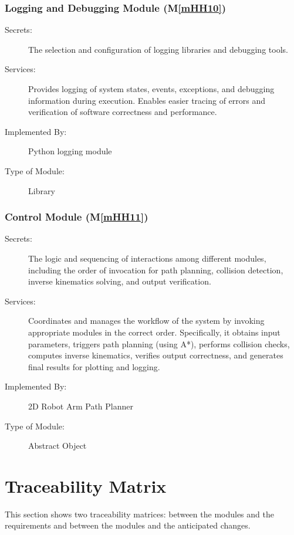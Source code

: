 \documentclass[12pt, titlepage]{article}
\newcommand{\mref}[1]{M\ref{#1}}
\begin{document}
\subsubsection{Logging and Debugging Module (\mref{mHH10})}

\begin{description}
\item[Secrets:] The selection and configuration of logging libraries and debugging tools.
\item[Services:] Provides logging of system states, events, exceptions, and debugging information during execution. Enables easier tracing of errors and verification of software correctness and performance.
\item[Implemented By:] Python logging module
\item[Type of Module:] Library
\end{description}

\subsubsection{Control Module (\mref{mHH11})}

\begin{description} \item[Secrets:] The logic and sequencing of interactions among different modules, including the order of invocation for path planning, collision detection, inverse kinematics solving, and output verification.

\item[Services:] Coordinates and manages the workflow of the system by invoking appropriate modules in the correct order. Specifically, it obtains input parameters, triggers path planning (using A*), performs collision checks, computes inverse kinematics, verifies output correctness, and generates final results for plotting and logging.

\item[Implemented By:] 2D Robot Arm Path Planner

\item[Type of Module:] Abstract Object \end{description}


\section{Traceability Matrix} \label{SecTM}

This section shows two traceability matrices: between the modules and the
requirements and between the modules and the anticipated changes.
\end{document}
